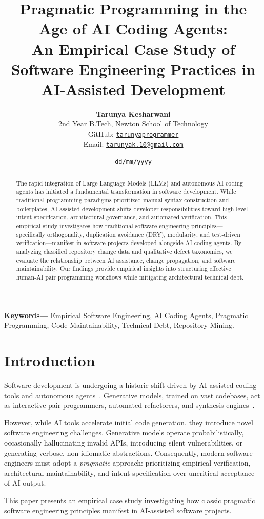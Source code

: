 \documentclass[10pt,twocolumn,a4paper]{article}
\title{\Large \textbf{Pragmatic Programming in the Age of AI Coding Agents:\\ An Empirical Case Study of Software Engineering Practices in AI-Assisted Development}}
\author{
  \textbf{Tarunya Kesharwani}\\
  \small 2nd Year B.Tech, Newton School of Technology\\
  \small GitHub: \href{https://github.com/tarunyaprogrammer}{\texttt{tarunyaprogrammer}}\\
  \small Email: \href{mailto:tarunyak.10@gmail.com}{\texttt{tarunyak.10@gmail.com}}
}
\date{\texttt{dd/mm/yyyy}}
\begin{document}
\maketitle

\begin{abstract}
The rapid integration of Large Language Models (LLMs) and autonomous AI coding agents has initiated a fundamental transformation in software development. While traditional programming paradigms prioritized manual syntax construction and boilerplates, AI-assisted development shifts developer responsibilities toward high-level intent specification, architectural governance, and automated verification. This empirical study investigates how traditional software engineering principles—specifically orthogonality, duplication avoidance (DRY), modularity, and test-driven verification—manifest in software projects developed alongside AI coding agents. By analyzing classified repository change data and qualitative defect taxonomies, we evaluate the relationship between AI assistance, change propagation, and software maintainability. Our findings provide empirical insights into structuring effective human-AI pair programming workflows while mitigating architectural technical debt.
\end{abstract}

\textbf{Keywords---} Empirical Software Engineering, AI Coding Agents, Pragmatic Programming, Code Maintainability, Technical Debt, Repository Mining.

\section{Introduction}
Software development is undergoing a historic shift driven by AI-assisted coding tools and autonomous agents~\cite{githubcopilot2023}. Generative models, trained on vast codebases, act as interactive pair programmers, automated refactorers, and synthesis engines~\cite{pragmaticai2024}.

However, while AI tools accelerate initial code generation, they introduce novel software engineering challenges. Generative models operate probabilistically, occasionally hallucinating invalid APIs, introducing silent vulnerabilities, or generating verbose, non-idiomatic abstractions. Consequently, modern software engineers must adopt a \textit{pragmatic} approach: prioritizing empirical verification, architectural maintainability, and intent specification over uncritical acceptance of AI output.

This paper presents an empirical case study investigating how classic pragmatic software engineering principles manifest in AI-assisted software projects.
\end{document}
